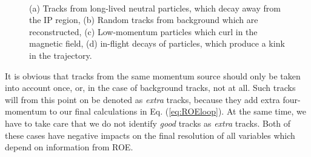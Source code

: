 \begin{figure}[H]
	\centering
	\\
	\captionsetup{width=.8\linewidth}
	\caption{(a) Tracks from long-lived neutral particles, which decay away from the IP region, (b) Random tracks from background which are reconstructed, (c) Low-momentum particles which curl in the magnetic field, (d) in-flight decays of particles, which produce a kink in the trajectory.}
	\label{fig:track_cleanup}
\end{figure}

It is obvious that tracks from the same momentum source should only be taken into account once, or, in the case of background tracks, not at all. Such tracks will from this point on be denoted as \textit{extra} tracks, because they add extra four-momentum to our final calculations in Eq. (\ref{eq:ROEloop}). At the same time, we have to take care that we do not identify \textit{good} tracks as \textit{extra} tracks. Both of these cases have negative impacts on the final resolution of all variables which depend on information from ROE.

